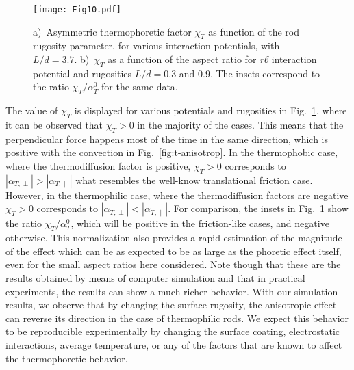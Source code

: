 \documentclass[aps,pre,twocolumn,showpacs,superscriptaddress]{revtex4-1}
\begin{document}
\begin{figure}[h!]
\texttt{[image: Fig10.pdf]}
\caption{a)~Asymmetric thermophoretic factor $\chi_T$ as
  function of the rod rugosity parameter, for various interaction
  potentials, with $L/d=3.7$. %
  b)~$\chi_T$ as a function of the aspect ratio for {\em r6} interaction
  potential and rugosities  $L/d=0.3$ and 0.9. %
  The insets correspond to the ratio $\chi_T/\alpha_T^0$ for the same data. 
  \label{fig:FT_chi} }
\end{figure}
The value of $\chi_T$ is displayed for various potentials and
rugosities in Fig.~\ref{fig:FT_chi}, where it can be observed that
$\chi_T>0$ in the majority of the cases. This means that the
perpendicular force happens most of the time in the same direction,
which is positive with the convection in
Fig.~\ref{fig:t-anisotrop}. %
In the thermophobic case, where the thermodiffusion factor is
positive, $\chi_T>0$ corresponds to $|\alpha_{T,\perp}| >
|\alpha_{T,\|}|$ what resembles the well-know translational friction
case.  However, in the thermophilic case, where the thermodiffusion
factors are negative $\chi_T>0$ corresponds to $|\alpha_{T,\perp}| <
|\alpha_{T,\|}|$. For comparison, the insets in Fig.~\ref{fig:FT_chi}
show the ratio $\chi_T/\alpha_T^0$, which will be positive in the
friction-like cases, and negative otherwise. %
This normalization also provides a rapid estimation of the magnitude
of the effect which can be as expected to be as large as the phoretic
effect itself, even for the small aspect ratios here considered. %
Note though that these are the results obtained by means of computer
simulation and that in practical experiments, the results can show a
much richer behavior.  With our simulation results, we observe that by
changing the surface rugosity, the anisotropic effect can reverse its
direction in the case of thermophilic rods. We expect this behavior to
be reproducible experimentally by changing the surface coating,
electrostatic interactions, average temperature, or any of the factors
that are known to affect the thermophoretic behavior.
\end{document}

